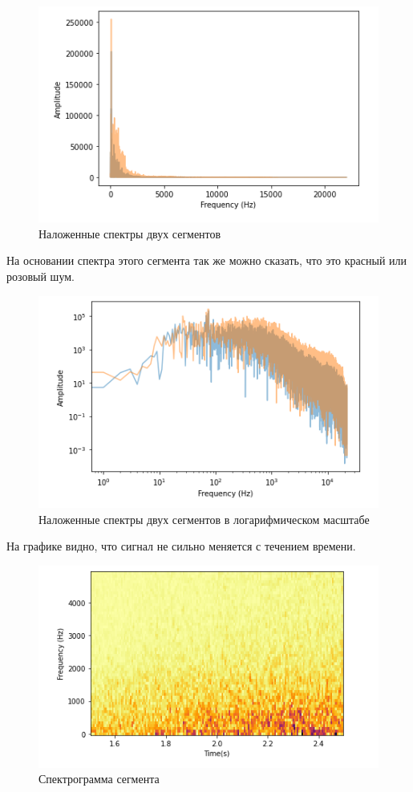 \documentclass[a4paper, 14pt]{extarticle}
\begin{document}
    \begin{figure}[H]
        \centering
        \includegraphics[width=0.8\linewidth]{sea_segment_1_and_2_spectr}
        \caption{Наложенные спектры двух сегментов}
        \label{fig:sea_segment_1_and_2_spectr}
    \end{figure}

    На основании спектра этого сегмента так же можно сказать, что это красный или розовый шум.

    \begin{figure}[H]
        \centering
        \includegraphics[width=0.8\linewidth]{sea_segment_1_and_2_spectr_log}
        \caption{Наложенные спектры двух сегментов в логарифмическом масштабе}
        \label{fig:sea_segment_1_and_2_spectr_log}
    \end{figure}

    На графике видно, что сигнал не сильно меняется с течением времени.

    \begin{figure}[H]
        \centering
        \includegraphics[width=0.8\linewidth]{sea_segment_spectrogram}
        \caption{Спектрограмма сегмента}
        \label{fig:sea_segment_spectrogram}
    \end{figure}
\end{document}
